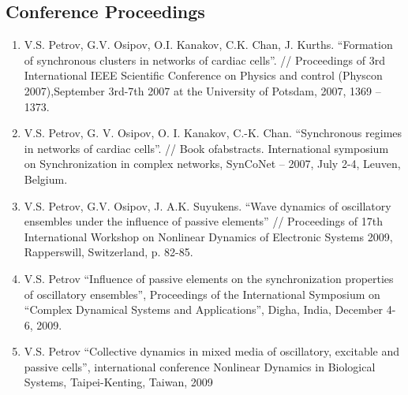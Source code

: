 \documentclass[line,margin,12pt]{res}
\begin{document}
\begin{resume}
\subsection{Conference Proceedings}
\begin{enumerate}
\item V.S. Petrov, G.V. Osipov, O.I. Kanakov, C.K. Chan, J. Kurths. “Formation of synchronous clusters in networks of
cardiac cells”. // Proceedings of 3rd International IEEE
Scientific Conference on Physics and control (Physcon 2007),September 3rd-7th 2007 at the University of Potsdam, 2007, 1369
– 1373.
\item V.S. Petrov, G. V. Osipov, O. I. Kanakov, C.-K. Chan.
“Synchronous regimes in networks of cardiac cells”. // Book ofabstracts. International symposium on Synchronization in
complex networks, SynCoNet – 2007, July 2-4, Leuven, Belgium.
\item V.S. Petrov, G.V. Osipov, J. A.K. Suyukens. “Wave dynamics of oscillatory ensembles under the influence of
passive elements” // Proceedings of 17th International Workshop on Nonlinear Dynamics of Electronic Systems 2009,
Rapperswill, Switzerland, p. 82-85.
\item V.S. Petrov “Influence of passive elements on the
synchronization properties of oscillatory ensembles”,
Proceedings of the International Symposium on “Complex
Dynamical Systems and Applications”, Digha, India, December
4-6, 2009.
\item V.S. Petrov “Collective dynamics in mixed media of
oscillatory, excitable and passive cells”, international conference
Nonlinear Dynamics in Biological Systems, Taipei-Kenting, Taiwan, 2009
\end{enumerate}
\end{resume}
\end{document}
